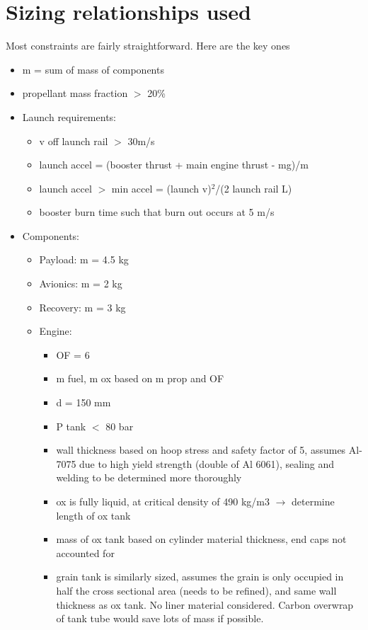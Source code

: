 \documentclass[12pt]{article}
\begin{document}
%
%

\section{Sizing relationships used}

Most constraints are fairly straightforward. Here are the key ones

\begin{itemize}
\item m = sum of mass of components
\item propellant mass fraction $>$ 20\%
\item Launch requirements:
\begin{itemize}
\item v off launch rail $>$ 30m/s
\item launch accel = (booster thrust + main engine thrust - mg)/m 
\item launch accel $>$ min accel = (launch v)$^2$/(2 launch rail L)
\item booster burn time such that burn out occurs at 5 m/s
\end{itemize}
\item Components:
\begin{itemize}
\item Payload: m = 4.5 kg
\item Avionics: m = 2 kg
\item Recovery: m = 3 kg
\item Engine: 
\begin{itemize}
\item OF = 6
\item m fuel, m ox based on m prop and OF
\item d = 150 mm
\item P tank $<$ 80 bar
\item wall thickness based on hoop stress and safety factor of 5, assumes Al-7075 due to high yield strength (double of Al 6061), sealing and welding to be determined more thoroughly
\item ox is fully liquid, at critical density of 490 kg/m3 $\rightarrow$ determine length of ox tank
\item mass of ox tank based on cylinder material thickness, end caps not accounted for
\item grain tank is similarly sized, assumes the grain is only occupied in half the cross sectional area (needs to be refined), and same wall thickness as ox tank. No liner material considered. Carbon overwrap of tank tube would save lots of mass if possible. 

\end{itemize}
\end{itemize}
\end{itemize}
\end{document}
